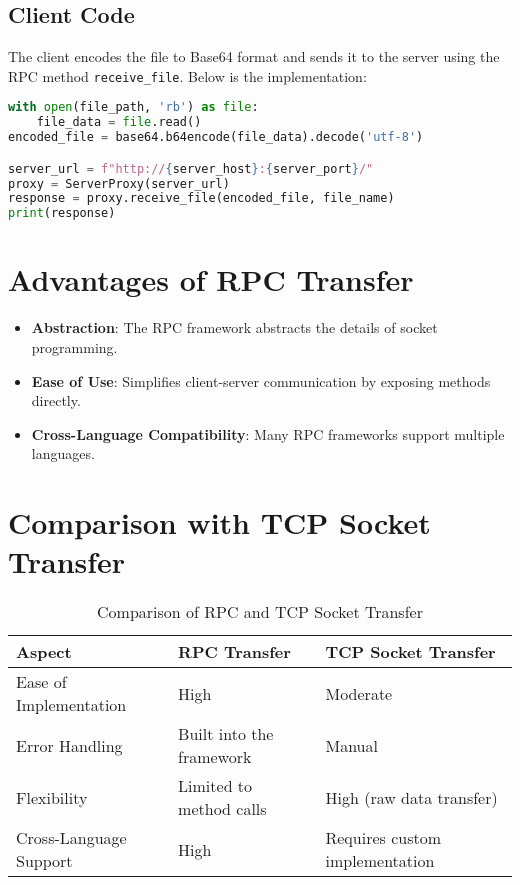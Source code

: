\documentclass[a4paper,12pt]{article}
\begin{document}
\subsection{Client Code}
The client encodes the file to Base64 format and sends it to the server using the RPC method \texttt{receive\_file}. Below is the implementation:

\begin{lstlisting}[language=Python]
with open(file_path, 'rb') as file:
    file_data = file.read()
encoded_file = base64.b64encode(file_data).decode('utf-8')

server_url = f"http://{server_host}:{server_port}/"
proxy = ServerProxy(server_url)
response = proxy.receive_file(encoded_file, file_name)
print(response)
\end{lstlisting}

\section{Advantages of RPC Transfer}
\begin{itemize}
    \item \textbf{Abstraction}: The RPC framework abstracts the details of socket programming.
    \item \textbf{Ease of Use}: Simplifies client-server communication by exposing methods directly.
    \item \textbf{Cross-Language Compatibility}: Many RPC frameworks support multiple languages.
\end{itemize}

\section{Comparison with TCP Socket Transfer}
\begin{table}[h!]
\centering
\begin{tabular}{|l|l|}
\hline
\textbf{Aspect} & \textbf{RPC Transfer} & \textbf{TCP Socket Transfer} \\
\hline
Ease of Implementation & High & Moderate \\
\hline
Error Handling & Built into the framework & Manual \\
\hline
Flexibility & Limited to method calls & High (raw data transfer) \\
\hline
Cross-Language Support & High & Requires custom implementation \\
\hline
\end{tabular}
\caption{Comparison of RPC and TCP Socket Transfer}
\end{table}
\end{document}
